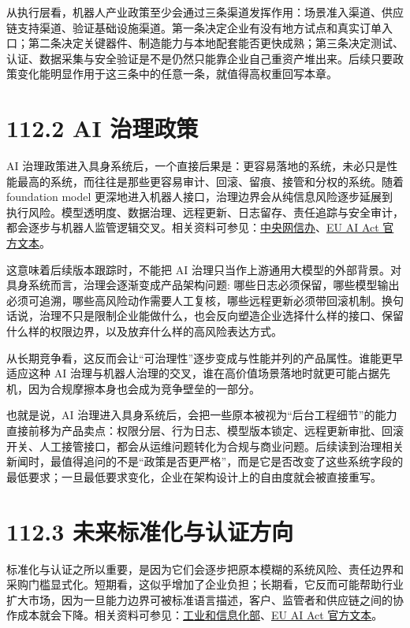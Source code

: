 从执行层看，机器人产业政策至少会通过三条渠道发挥作用：场景准入渠道、供应链支持渠道、验证基础设施渠道。第一条决定企业有没有地方试点和真实订单入口；第二条决定关键器件、制造能力与本地配套能否更快成熟；第三条决定测试、认证、数据采集与安全验证是不是仍然只能靠企业自己重资产堆出来。后续只要政策变化能明显作用于这三条中的任意一条，就值得高权重回写本章。

\section*{112.2 AI 治理政策}


AI 治理政策进入具身系统后，一个直接后果是：更容易落地的系统，未必只是性能最高的系统，而往往是那些更容易审计、回滚、留痕、接管和分权的系统。随着 foundation model 更深地进入机器人接口，治理边界会从纯信息风险逐步延展到执行风险。模型透明度、数据治理、远程更新、日志留存、责任追踪与安全审计，都会逐步与机器人监管逻辑交叉。相关资料可参见：\href{https://www.cac.gov.cn/}{中央网信办}、\href{https://data.europa.eu/eli/reg/2024/1689/oj}{EU AI Act 官方文本}。

这意味着后续版本跟踪时，不能把 AI 治理只当作上游通用大模型的外部背景。对具身系统而言，治理会逐渐变成产品架构问题: 哪些日志必须保留，哪些模型输出必须可追溯，哪些高风险动作需要人工复核，哪些远程更新必须带回滚机制。换句话说，治理不只是限制企业能做什么，也会反向塑造企业选择什么样的接口、保留什么样的权限边界，以及放弃什么样的高风险表达方式。

从长期竞争看，这反而会让“可治理性”逐步变成与性能并列的产品属性。谁能更早适应这种 AI 治理与机器人治理的交叉，谁在高价值场景落地时就更可能占据先机，因为合规摩擦本身也会成为竞争壁垒的一部分。

也就是说，AI 治理进入具身系统后，会把一些原本被视为“后台工程细节”的能力直接前移为产品卖点：权限分层、行为日志、模型版本锁定、远程更新审批、回滚开关、人工接管接口，都会从运维问题转化为合规与商业问题。后续读到治理相关新闻时，最值得追问的不是“政策是否更严格”，而是它是否改变了这些系统字段的最低要求；一旦最低要求变化，企业在架构设计上的自由度就会被直接重写。

\section*{112.3 未来标准化与认证方向}


标准化与认证之所以重要，是因为它们会逐步把原本模糊的系统风险、责任边界和采购门槛显式化。短期看，这似乎增加了企业负担；长期看，它反而可能帮助行业扩大市场，因为一旦能力边界可被标准语言描述，客户、监管者和供应链之间的协作成本就会下降。相关资料可参见：\href{https://www.miit.gov.cn/}{工业和信息化部}、\href{https://data.europa.eu/eli/reg/2024/1689/oj}{EU AI Act 官方文本}。

